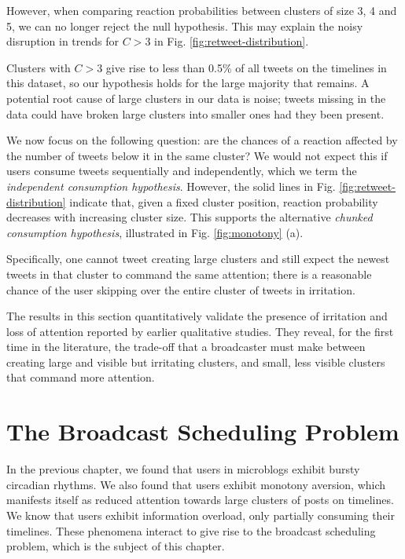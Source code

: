 \documentclass[onecolumn, 12 pt, doublespace, fullpage, letterpaper]{report}
\begin{document}
However, when comparing reaction probabilities between clusters of size 3, 4 and 5, we can no longer reject the null hypothesis. This may explain the noisy disruption in trends for $C > 3$ in Fig. \ref{fig:retweet-distribution}.

Clusters with $C > 3$ give rise to less than 0.5\% of all tweets on the timelines in this dataset, so our hypothesis holds for the large majority that remains. A potential root cause of large clusters in our data is noise; tweets missing in the data could have broken large clusters into smaller ones had they been present.

We now focus on the following question: are the chances of a reaction affected by the number of tweets below it in the same cluster? We would not expect this if users consume tweets sequentially and independently, which we term the \textit{independent consumption hypothesis}. However, the solid lines in Fig. \ref{fig:retweet-distribution} indicate that, given a fixed cluster position, reaction probability decreases with increasing cluster size. This supports the alternative \textit{chunked consumption hypothesis}, illustrated in Fig. \ref{fig:monotony} (a).

Specifically, one cannot tweet creating large clusters and still expect the newest tweets in that cluster to command the same attention; there is a reasonable chance of the user skipping over the entire cluster of tweets in irritation.

The results in this section quantitatively validate the presence of irritation and loss of attention reported by earlier qualitative studies. They reveal, for the first time in the literature, the trade-off that a broadcaster must make between creating large and visible but irritating clusters, and small, less visible clusters that command more attention.

\chapter{The Broadcast Scheduling Problem}
\label{ch:problem}

In the previous chapter, we found that users in microblogs exhibit bursty circadian rhythms. We also found that users exhibit monotony aversion, which manifests itself as reduced attention towards large clusters of posts on timelines. We know that users exhibit information overload, only partially consuming their timelines. These phenomena interact to give rise to the broadcast scheduling problem, which is the subject of this chapter.
\end{document}
